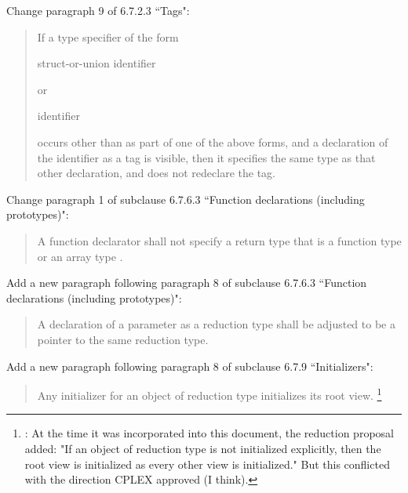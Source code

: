 Change paragraph 9 of 6.7.2.3 ``Tags":

\begin{quote}
If a type specifier of the form

\begin{bnf}
struct-or-union identifier
\end{bnf}


\begin{bnf}
 
\end{bnf}

or

\begin{bnf}
 identifier
\end{bnf}

occurs other than as part of one of the above forms,
and a declaration of the identifier as a tag is visible,
then it specifies the same type as that other declaration,
and does not redeclare the tag.
\end{quote}

Change paragraph 1 of subclause 6.7.6.3
``Function declarations (including prototypes)":

\begin{quote}
A function declarator shall not specify a return type
that is a function type or an array type
.
\end{quote}

Add a new paragraph following paragraph 8 of subclause 6.7.6.3
``Function declarations (including prototypes)":

\begin{quote}
A declaration of a parameter as a reduction type
shall be adjusted to be a pointer to the same reduction type.
\end{quote}

Add a new paragraph following paragraph 8
of subclause 6.7.9 ``Initializers":

\begin{quote}
Any initializer for an object of reduction type initializes its root view.
\footnote{:
At the time it was incorporated into this document,
the reduction proposal added:
"If an object of reduction type is not initialized explicitly,
then the root view is initialized as every other view is initialized."
But this conflicted with the direction CPLEX approved (I think).
}
\end{quote}


